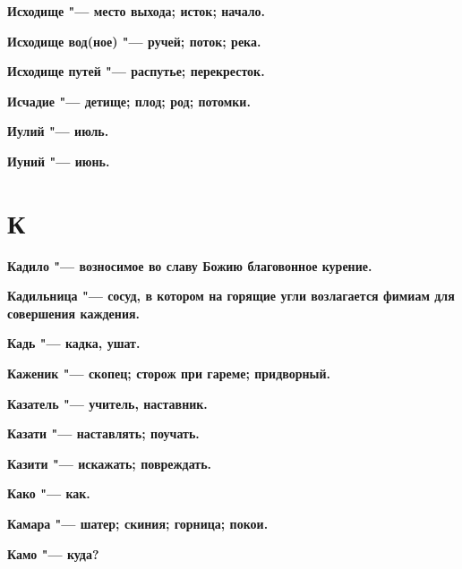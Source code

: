 \begin{mymulticols}{2}
\bfseries Исходище\normalfont{} "--- место выхода; исток; начало. 




\bfseries Исходище вод(ное)\normalfont{} "--- ручей; поток; река. 




\bfseries Исходище путей\normalfont{} "--- распутье; перекресток. 




\bfseries Исчадие\normalfont{} "--- детище; плод; род; потомки. 




\bfseries Иулий\normalfont{} "--- июль. 




\bfseries Иуний\normalfont{} "--- июнь. 




\section{К}





\bfseries Кадило\normalfont{} "--- возносимое во славу Божию благовонное курение. 




\bfseries Кадильница\normalfont{} "--- сосуд, в котором на горящие угли возлагается фимиам для совершения каждения. 




\bfseries Кадь\normalfont{} "--- кадка, ушат. 




\bfseries Каженик\normalfont{} "--- скопец; сторож при гареме; придворный. 




\bfseries Казатель\normalfont{} "--- учитель, наставник. 




\bfseries Казати\normalfont{} "--- наставлять; поучать. 




\bfseries Казити\normalfont{} "--- искажать; повреждать. 




\bfseries Како\normalfont{} "--- как. 




\bfseries Камара\normalfont{} "--- шатер; скиния; горница; покои. 




\bfseries Камо\normalfont{} "--- куда? 





\end{mymulticols}
